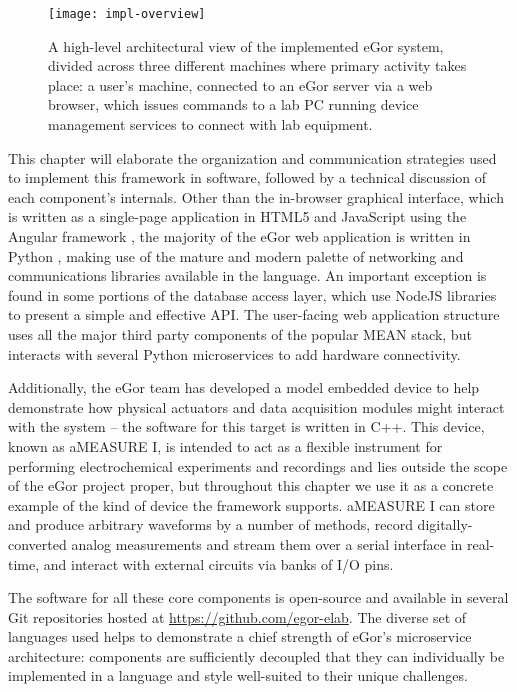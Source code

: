 \documentclass[../thesis]{subfiles}
\begin{document}
\begin{figure}
  \texttt{[image: impl-overview]}
  \caption[High-level structure of the eGor system]{
    A high-level architectural view of the implemented eGor system,
    divided across three different machines where primary activity
    takes place: a user's machine, connected to an eGor server via a
    web browser, which issues commands to a lab PC running device
    management services to connect with lab equipment.
    \label{fig:ImplOverview}
  }
\end{figure}

This chapter will elaborate the organization and communication
strategies used to implement this framework in software, followed by a
technical discussion of each component's internals.  Other than the
in-browser graphical interface, which is written as a single-page
application in HTML5 and JavaScript using the Angular framework
\cite{Angular}, the majority of the eGor web application is written in
Python \cite{Python}, making use of the mature and modern palette of
networking and communications libraries available in the language. An
important exception is found in some portions of the database access
layer, which use NodeJS \cite{NodeJS} libraries to present a simple
and effective API. The user-facing web application structure uses all
the major third party components of the popular \gls{MEAN} stack, but
interacts with several Python microservices to add hardware
connectivity.

Additionally, the eGor team has developed a model
embedded device to help demonstrate how physical actuators and data
acquisition modules might interact with the system -- the software for
this target is written in C++. This device, known as aMEASURE I, is intended to
act as a flexible instrument for performing electrochemical
experiments and recordings and lies outside the scope of the eGor project
proper, but throughout this chapter we use it as a concrete example of
the kind of device the framework supports. aMEASURE I can store and
produce arbitrary waveforms by a number of methods, record
digitally-converted analog measurements and stream them over a serial
interface in real-time, and interact with external circuits via banks
of I/O pins.

The software for all these core
components is open-source and available in several Git repositories
hosted at \url{https://github.com/egor-elab}. The diverse set of
languages used helps to demonstrate a chief strength of eGor's
microservice architecture: components are sufficiently decoupled that
they can individually be implemented in a language and style
well-suited to their unique challenges.
\end{document}

